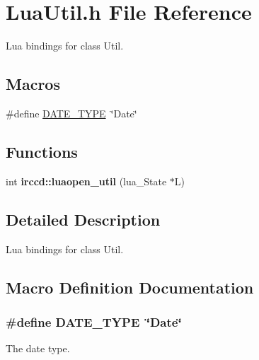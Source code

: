 \hypertarget{a00111}{\section{Lua\-Util.\-h File Reference}
\label{a00111}
}


Lua bindings for class Util.  


\subsection*{Macros}
\begin{DoxyCompactItemize}
\item 
\#define \hyperlink{a00111_a1979ff3f9e0d2174720692bafa03bcdf}{D\-A\-T\-E\-\_\-\-T\-Y\-P\-E}~\char`\"{}Date\char`\"{}
\end{DoxyCompactItemize}
\subsection*{Functions}
\begin{DoxyCompactItemize}
\item 
int {\bfseries irccd\-::luaopen\-\_\-util} (lua\-\_\-\-State $\ast$L)
\end{DoxyCompactItemize}


\subsection{Detailed Description}
Lua bindings for class Util. 

\subsection{Macro Definition Documentation}
\hypertarget{a00111_a1979ff3f9e0d2174720692bafa03bcdf}{
\subsubsection[{D\-A\-T\-E\-\_\-\-T\-Y\-P\-E}]{\setlength{\rightskip}{0pt plus 5cm}\#define D\-A\-T\-E\-\_\-\-T\-Y\-P\-E~\char`\"{}Date\char`\"{}}}\label{a00111_a1979ff3f9e0d2174720692bafa03bcdf}
The date type. 
